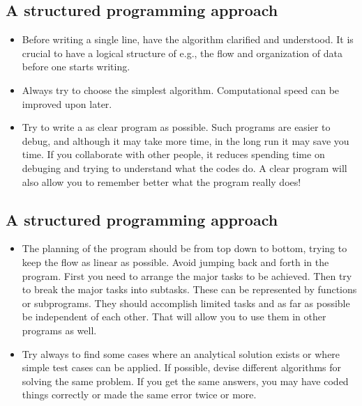 \documentclass[%
oneside,                 %
final,                   %
10pt]{article}
\begin{document}
\noindent



\subsection*{A structured programming approach}

\begin{itemize}
  \item Before writing a single line, have the algorithm clarified and understood. It is crucial to have a logical structure of e.g., the flow and organization of data before one starts writing.

  \item Always try to choose the simplest algorithm. Computational speed can be improved upon later.

  \item Try to write a as clear program as possible. Such programs are easier to debug, and although it may take more time, in the long run it may save you time. If you collaborate with other people, it reduces spending time on debuging and trying to understand what the codes do. A clear program will also allow you to remember better what the program really does!
\end{itemize}

\noindent
\subsection*{A structured programming approach}

\begin{itemize}
  \item The planning of the program should be from top down to bottom, trying to keep the flow as linear as possible. Avoid jumping back and forth in the program. First you need to arrange the major tasks to be achieved. Then try to break the major tasks into subtasks. These can be represented by functions or subprograms. They should accomplish limited tasks and as far as possible be independent of each other. That will allow you to use them in other programs as well.

  \item Try always to find some cases where an analytical solution exists or where simple test cases can be applied. If possible, devise different algorithms for solving the same problem. If you get the same answers, you may have coded things correctly or made the same error twice or more.
\end{itemize}

\noindent



\printindex
\end{document}
